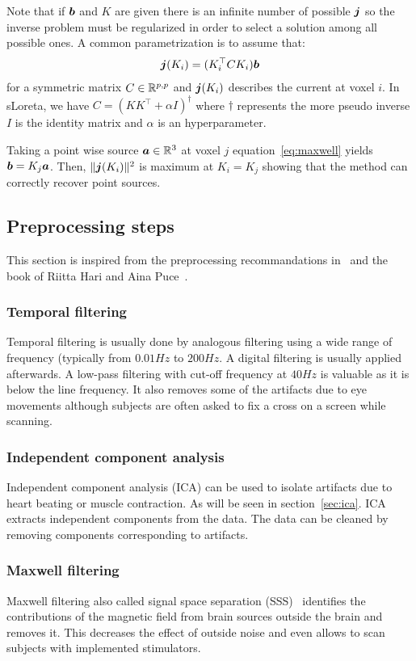 Note that if $\boldsymbol{b}$ and $K$ are given there is an infinite number of possible
$\boldsymbol{j}$ so the inverse problem must be regularized in order to select a solution among all possible ones.
A common parametrization is to assume that:
\begin{align}
\boldsymbol{j}(K_i) = (K_i^{\top} C K_i) \boldsymbol{b}
\end{align}
for a symmetric matrix $C \in \mathbb{R}^{p, p}$ and $\boldsymbol{j}(K_i)$ describes the current at voxel $i$.
In sLoreta, we have $C = (K K^{\top} + \alpha I)^{\dagger}$ where $\dagger$
represents the more pseudo inverse $I$ is the identity matrix and $\alpha$ is an hyperparameter. 

Taking a point wise source $\boldsymbol{a} \in \mathbb{R}^{3}$ at voxel $j$
equation~\eqref{eq:maxwell} yields $\boldsymbol{b} = K_j \boldsymbol{a}$.
Then, $\| \boldsymbol{j}(K_i) \|^2$ is maximum at $K_i=K_j$ showing that the method can correctly recover point sources.

\subsection{Preprocessing steps}
This section is inspired from the preprocessing recommandations
in~\cite{jas2018reproducible} and the book of Riitta Hari and Aina
Puce~\cite{hari2017meg}. 

\subsubsection{Temporal filtering}
Temporal filtering is usually done by analogous filtering using a wide range of
frequency (typically from $0.01 Hz$ to $200Hz$.
A digital filtering is usually applied afterwards. A low-pass filtering with
cut-off frequency at $40 Hz$ is valuable as it is below the line frequency. It
also removes some of the artifacts due to eye movements although subjects are
often asked to fix a cross on a screen while scanning.

\subsubsection{Independent component analysis}
Independent component analysis (ICA) can be used to isolate artifacts due to
heart beating or muscle contraction. As will be seen in section~\ref{sec:ica}.
ICA extracts independent components from the data. The data can be cleaned by
removing components corresponding to artifacts.

\subsubsection{Maxwell filtering}
Maxwell filtering also called signal space separation
(SSS)~\cite{taulu2006spatiotemporal} identifies the contributions of the
magnetic field from brain sources outside the brain and removes it.
This decreases the effect of outside noise and even allows to scan subjects with
implemented stimulators.



